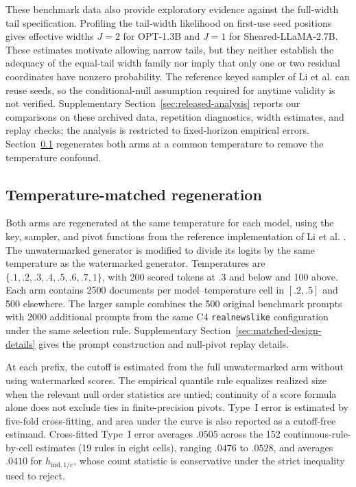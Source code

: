 \documentclass[11pt]{article}
\begin{document}
These benchmark data also provide exploratory evidence against the full-width
tail specification.  Profiling the tail-width likelihood on first-use seed
positions gives effective widths $J=2$ for OPT-1.3B and $J=1$ for
Sheared-LLaMA-2.7B.  These estimates motivate allowing narrow tails, but they
neither establish the adequacy of the equal-tail width family nor imply that
only one or two residual coordinates have nonzero probability.  The reference
keyed sampler of Li et al. can reuse seeds, so the conditional-null assumption required for
anytime validity is not verified.  Supplementary
Section~\ref{sec:released-analysis} reports our comparisons on these archived data,
repetition diagnostics, width estimates, and replay checks; the analysis is
restricted to fixed-horizon empirical errors.  Section~\ref{sec:temperature-matched}
regenerates both arms at a common temperature to remove the temperature confound.

\FloatBarrier

\subsection{Temperature-matched regeneration}
\label{sec:temperature-matched}

Both arms are regenerated at the same temperature for each model, using the
key, sampler, and pivot functions from the reference implementation of Li et al. \citep{li2024watermarkframework}.
The unwatermarked generator is modified to divide its logits by the same
temperature as the watermarked generator.  Temperatures are
$\{.1,.2,.3,.4,.5,.6,.7,1\}$, with 200 scored tokens at $.3$ and below and 100
above.  Each arm contains 2500 documents per model--temperature cell in
$[.2,.5]$ and 500 elsewhere.  The larger sample combines the 500 original benchmark
prompts with 2000 additional prompts from the same C4
\texttt{realnewslike} configuration under the same selection rule.
Supplementary Section~\ref{sec:matched-design-details} gives the prompt
construction and null-pivot replay details.

At each prefix, the cutoff is estimated from the full unwatermarked arm without using watermarked scores.  The empirical quantile rule equalizes realized size when the relevant null order statistics are untied; continuity of a score formula alone does not exclude ties in finite-precision pivots.  Type~I error is estimated by five-fold cross-fitting, and area under the curve is also reported as a cutoff-free estimand.  Cross-fitted Type~I error averages $.0505$ across the 152 continuous-rule-by-cell estimates (19 rules in eight cells), ranging $.0476$ to $.0528$, and averages $.0410$ for $h_{\mathrm{ind},1/e}$, whose count statistic is conservative under the strict inequality used to reject.
\end{document}
